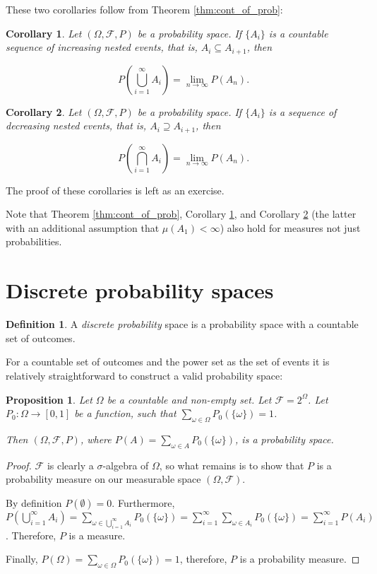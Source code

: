 \documentclass{book}
\theoremstyle{plain}%
\newtheorem{corollary}{Corollary}[section]
\newtheorem{proposition}{Proposition}[section]
\theoremstyle{definition}
\newtheorem{definition}{Definition}[section]
\newlength{\arrow}
\begin{document}
These two corollaries follow from Theorem \ref{thm:cont_of_prob}:

\begin{corollary}
Let $(\Omega, \mathcal{F}, P)$ be a probability space. If $\{A_i\}$ is a countable sequence of increasing nested events, that is, $A_i \subseteq A_{i+1}$, then

$$P(\bigcup_{i=1}^\infty A_i) = \displaystyle\lim_{n\rightarrow\infty} P(A_n).$$\label{cor:001}
\end{corollary}

\begin{corollary}
Let $(\Omega, \mathcal{F}, P)$ be a probability space. If $\{A_i\}$ is a sequence of decreasing nested events, that is, $A_{i} \supseteq A_{i+1}$, then

$$P(\bigcap_{i=1}^\infty A_i) = \displaystyle\lim_{n\rightarrow\infty} P(A_n).$$\label{cor:002}
\end{corollary}

The proof of these corollaries is left as an exercise.

Note that Theorem \ref{thm:cont_of_prob}, Corollary \ref{cor:001}, and Corollary \ref{cor:002} (the latter with an additional assumption that $\mu(A_1) < \infty$) also hold for measures not just probabilities.

\section{Discrete probability spaces}

\begin{definition}
A \emph{discrete probability} space is a probability space with a countable set of outcomes.
\end{definition}

For a countable set of outcomes and the power set as the set of events it is relatively straightforward to construct a valid probability space:

\begin{proposition}
Let $\Omega$ be a countable and non-empty set. Let $\mathcal{F} = 2^\Omega$. Let $P_0: \Omega \rightarrow [0,1]$ be a function, such that $\sum_{\omega \in \Omega} P_0(\{\omega\}) = 1$.

Then $(\Omega, \mathcal{F}, P)$, where $P(A) = \sum_{\omega \in A} P_0(\{\omega\})$, is a probability space.\label{prop:discrete_prob_space}
\end{proposition}

\begin{proof}
$\mathcal{F}$ is clearly a $\sigma$-algebra of $\Omega$, so what remains is to show that $P$ is a probability measure on our measurable space $(\Omega, \mathcal{F})$.

By definition $P(\emptyset) = 0$. Furthermore, $P(\bigcup_{i=1}^\infty A_i) = \sum_{\omega \in \bigcup_{i=1}^\infty A_i} P_0(\{\omega\}) = \sum_{i=1}^\infty \sum_{\omega \in A_i} P_0(\{\omega\}) = \sum_{i=1}^\infty P(A_i)$. Therefore, $P$ is a measure.

Finally, $P(\Omega) = \sum_{\omega \in \Omega} P_0(\{\omega\}) = 1$, therefore, $P$ is a probability measure.
\end{proof}
\end{document}
